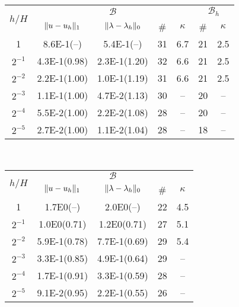 \begin{table}
{\begin{minipage}{0.49\textwidth}
  \end{minipage}
  }
    \scriptsize{%
    \begin{minipage}{0.49\textwidth}
  \begin{center}
    \begin{tabular}{c|cccc||cc}
      \hline
      \multirow{2}{*}{$h/H$} & \multicolumn{4}{c||}{$\mathcal{B}$} & \multicolumn{2}{c}{$\mathcal{B}_{h}$}\\
      \cline{2-7}
      & $\lVert{u-u_h}\rVert_1$ & $\lVert{\lambda-\lambda_h}\rVert_0$ & \# & $\kappa$ & \# & $\kappa$\\
      \hline
1       & 8.6E-1(--) & 5.4E-1(--)  & 31 & 6.7 & 21 & 2.5\\
$2^{-1}$ & 4.3E-1(0.98) & 2.3E-1(1.20)& 32 & 6.6 & 21 & 2.5\\
$2^{-2}$ & 2.2E-1(1.00) & 1.0E-1(1.19)& 31 & 6.6 & 21 & 2.5\\
$2^{-3}$ & 1.1E-1(1.00) & 4.7E-2(1.13)& 30 & --  & 20 & --  \\
$2^{-4}$ & 5.5E-2(1.00) & 2.2E-2(1.08)& 28 & --  & 20 & --  \\
$2^{-5}$ & 2.7E-2(1.00) & 1.1E-2(1.04)& 28 & --  & 18 & --  \\
      \hline
  \end{tabular}
  \end{center}
  \end{minipage}
    }
    \vspace{5pt}
    \\
  \scriptsize{%
    \begin{minipage}{0.49\textwidth}
  \begin{center}
    \begin{tabular}{c|cccc}
      \hline
      \multirow{2}{*}{$h/H$} & \multicolumn{4}{c|}{$\mathcal{B}$}\\
      \cline{2-5}
      & $\lVert{u-u_h}\rVert_1$ & $\lVert{\lambda-\lambda_h}\rVert_0$ & \# & $\kappa$\\
      \hline
1       & 1.7E0(--)    & 2.0E0(--)    & 22 &4.5\\
$2^{-1}$ & 1.0E0(0.71)  & 1.2E0(0.71)  & 27 &5.1\\
$2^{-2}$ & 5.9E-1(0.78) & 7.7E-1(0.69) & 29 &5.4\\
$2^{-3}$ & 3.3E-1(0.85) & 4.9E-1(0.64) & 29 &-- \\
$2^{-4}$ & 1.7E-1(0.91) & 3.3E-1(0.59) & 28 &-- \\
$2^{-5}$ & 9.1E-2(0.95) & 2.2E-1(0.55) & 26 &-- \\
      \hline
  \end{tabular}

\end{center}
\end{minipage}}
\end{table}
